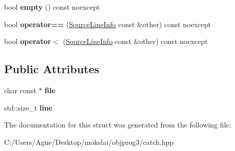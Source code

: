 \begin{DoxyCompactItemize}
bool {\bfseries empty} () const noexcept
\item 
\mbox{\label{struct_catch_1_1_source_line_info_af07e4fdeddf8409b91e4f842f6264cf8}} 
bool {\bfseries operator==} (\mbox{\hyperlink{struct_catch_1_1_source_line_info}{Source\+Line\+Info}} const \&other) const noexcept
\item 
\mbox{\label{struct_catch_1_1_source_line_info_af77415416919d2d6030b4be085b92f7a}} 
bool {\bfseries operator$<$} (\mbox{\hyperlink{struct_catch_1_1_source_line_info}{Source\+Line\+Info}} const \&other) const noexcept
\end{DoxyCompactItemize}
\subsection*{Public Attributes}
\begin{DoxyCompactItemize}
\item 
\mbox{\label{struct_catch_1_1_source_line_info_ad65537703e9f08c1fa7777fbc3f0c617}} 
char const  $\ast$ {\bfseries file}
\item 
\mbox{\label{struct_catch_1_1_source_line_info_a841e5d696c7b9cde24e45e61dd979c77}} 
std\+::size\+\_\+t {\bfseries line}
\end{DoxyCompactItemize}


The documentation for this struct was generated from the following file\+:\begin{DoxyCompactItemize}
\item 
C\+:/\+Users/\+Agne/\+Desktop/mokslai/objprog3/catch.\+hpp\end{DoxyCompactItemize}
